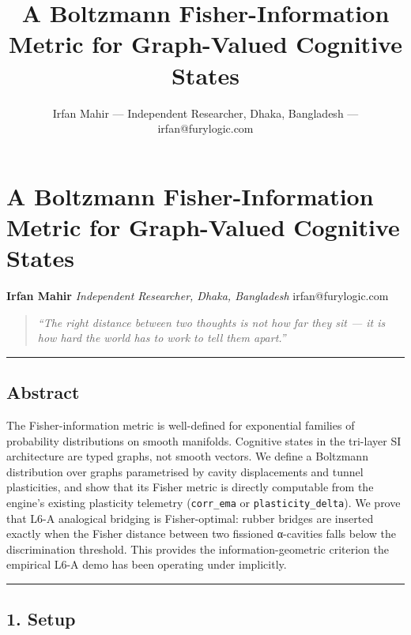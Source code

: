 \documentclass[
  11pt,
  a4paper,
]{article}
\title{A Boltzmann Fisher-Information Metric for Graph-Valued Cognitive
States}
\author{Irfan Mahir --- Independent Researcher, Dhaka, Bangladesh ---
irfan@furylogic.com}
\date{}
\begin{document}
\maketitle

{
\hypersetup{linkcolor=}
\setcounter{tocdepth}{3}
\tableofcontents
}
\section{A Boltzmann Fisher-Information Metric for Graph-Valued
Cognitive
States}\label{a-boltzmann-fisher-information-metric-for-graph-valued-cognitive-states}

\textbf{Irfan Mahir} \emph{Independent Researcher, Dhaka, Bangladesh}
irfan@furylogic.com

\begin{quote}
\emph{``The right distance between two thoughts is not how far they sit
--- it is how hard the world has to work to tell them apart.''}
\end{quote}

\begin{center}\rule{0.5\linewidth}{0.5pt}\end{center}

\subsection{Abstract}\label{abstract}

The Fisher-information metric is well-defined for exponential families
of probability distributions on smooth manifolds. Cognitive states in
the tri-layer SI architecture are typed graphs, not smooth vectors. We
define a Boltzmann distribution over graphs parametrised by cavity
displacements and tunnel plasticities, and show that its Fisher metric
is directly computable from the engine's existing plasticity telemetry
(\texttt{corr\_ema} or \texttt{plasticity\_delta}). We prove that L6-A
analogical bridging is Fisher-optimal: rubber bridges are inserted
exactly when the Fisher distance between two fissioned α-cavities falls
below the discrimination threshold. This provides the
information-geometric criterion the empirical L6-A demo has been
operating under implicitly.

\begin{center}\rule{0.5\linewidth}{0.5pt}\end{center}

\subsection{1. Setup}\label{setup}
\end{document}
